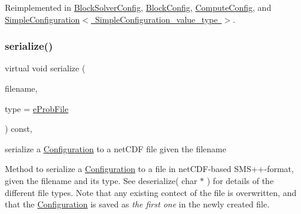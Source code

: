 Reimplemented in \mbox{\hyperlink{class_s_m_spp__di__unipi__it_1_1_block_solver_config_a59a9fcbf8f9f86d348344b2073644b0e}{Block\+Solver\+Config}}, \mbox{\hyperlink{class_s_m_spp__di__unipi__it_1_1_block_config_a59a9fcbf8f9f86d348344b2073644b0e}{Block\+Config}}, \mbox{\hyperlink{class_s_m_spp__di__unipi__it_1_1_compute_config_a59a9fcbf8f9f86d348344b2073644b0e}{Compute\+Config}}, and \mbox{\hyperlink{class_s_m_spp__di__unipi__it_1_1_simple_configuration_a59a9fcbf8f9f86d348344b2073644b0e}{Simple\+Configuration$<$ Simple\+Configuration\+\_\+value\+\_\+type $>$}}.

\mbox{\label{class_s_m_spp__di__unipi__it_1_1_configuration_a761852c919ce4cc745f6a973733340c5}} 
\subsubsection{\texorpdfstring{serialize()}{serialize()}\hspace{0.1cm}{\footnotesize\ttfamily [1/3]}}
{\footnotesize\ttfamily virtual void serialize (\begin{DoxyParamCaption}\item[{const char $\ast$}]{filename,  }\item[{const int}]{type = {\ttfamily \mbox{\hyperlink{group___s_m_s__types_ggab8fe98d4e6a9961e16ab25006d6eebd8ab4763484df9e463c82bde775db014c10}{e\+Prob\+File}}} }\end{DoxyParamCaption}) const\hspace{0.3cm}{\ttfamily [inline]}, {\ttfamily [virtual]}}



serialize a \mbox{\hyperlink{class_s_m_spp__di__unipi__it_1_1_configuration}{Configuration}} to a net\+C\+DF file given the filename 

Method to serialize a \mbox{\hyperlink{class_s_m_spp__di__unipi__it_1_1_configuration}{Configuration}} to a file in net\+C\+D\+F-\/based S\+M\+S++-\/format, given the filename and its type. See deserialize( char $\ast$ ) for details of the different file types. Note that any existing contect of the file is overwritten, and that the \mbox{\hyperlink{class_s_m_spp__di__unipi__it_1_1_configuration}{Configuration}} is saved as {\itshape the first one} in the newly created file.

